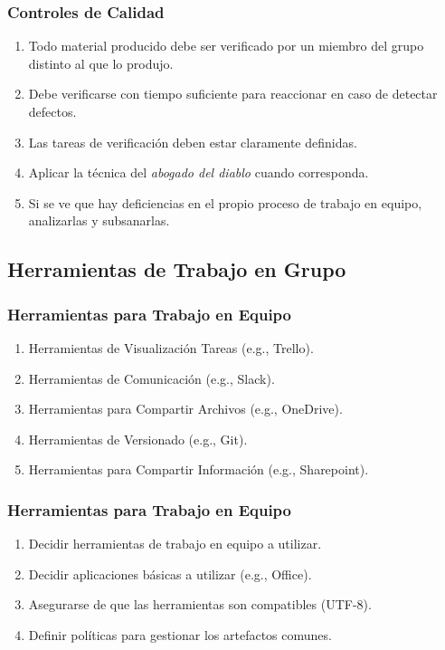 \documentclass[a4paper,t,xcolor=pst,dvips]{beamer}
\begin{document}
\begin{frame}[c]
	\frametitle{Controles de Calidad}
	\begin{enumerate}[<+->]
		\item Todo material producido debe ser verificado por un miembro del grupo distinto al que lo produjo.
		\item Debe verificarse con tiempo suficiente para reaccionar en caso de detectar defectos.
		\item Las tareas de verificación deben estar claramente definidas.
		\item Aplicar la técnica del \emph{abogado del diablo} cuando corresponda.
		\item Si se ve que hay deficiencias en el propio proceso de trabajo en equipo, analizarlas y subsanarlas.
	\end{enumerate}
\end{frame}

\subsection{Herramientas de Trabajo en Grupo}

\begin{frame}[c]
	\frametitle{Herramientas para Trabajo en Equipo}
	\begin{enumerate}[<+->]
		\item Herramientas de Visualización Tareas (e.g., Trello).
		\item Herramientas de Comunicación (e.g., Slack).
		\item Herramientas para Compartir Archivos (e.g., OneDrive).
		\item Herramientas de Versionado (e.g., Git).
		\item Herramientas para Compartir Información (e.g., Sharepoint).
	\end{enumerate}
\end{frame}

\begin{frame}[c]
	\frametitle{Herramientas para Trabajo en Equipo}
	\begin{enumerate}[<+->]
		\item Decidir herramientas de trabajo en equipo a utilizar.
		\item Decidir aplicaciones básicas a utilizar (e.g., Office). 
		\item Asegurarse de que las herramientas son compatibles (UTF-8).
		\item Definir políticas para gestionar los artefactos comunes.
	\end{enumerate}
\end{frame}
\end{document}
